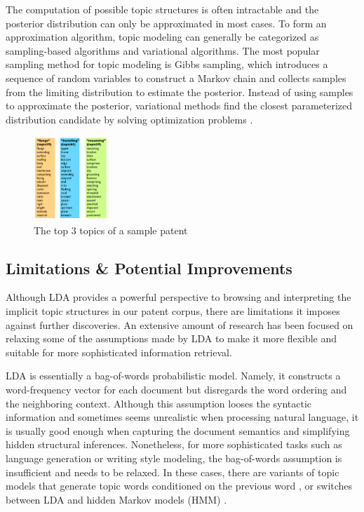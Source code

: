 \documentclass[conference]{IEEEtran}
\begin{document}
The computation of possible topic structures is often intractable and the posterior distribution can only be approximated in most cases. To form an approximation algorithm, topic modeling can generally be categorized as sampling-based algorithms and variational algorithms. The most popular sampling method for topic modeling is Gibbs sampling, which introduces a sequence of random variables to construct a Markov chain and collects samples from the limiting distribution to estimate the posterior. Instead of using samples to approximate the posterior, variational methods find the closest parameterized distribution candidate by solving optimization problems \cite{lda2003} \cite{bach2010}.

\begin{figure}[h]
	\center
	\includegraphics[width=0.25\textwidth]{fig/topics.png}
	\caption{The top 3 topics of a sample patent}
	\label{top3topics}
\end{figure}





\subsection{Limitations \& Potential Improvements}
Although LDA provides a powerful perspective to browsing and interpreting the implicit topic structures in our patent corpus, there are limitations it imposes against further discoveries. An extensive amount of research has been focused on relaxing some of the assumptions made by LDA to make it more flexible and suitable for more sophisticated information retrieval. 

LDA is essentially a bag-of-words probabilistic model. Namely, it constructs a word-frequency vector for each document but disregards the word ordering and the neighboring context. Although this assumption looses the syntactic information and sometimes seems unrealistic when processing natural language, it is usually good enough when capturing the document semantics and simplifying hidden structural inferences. Nonetheless, for more sophisticated tasks such as language generation or writing style modeling, the bag-of-words assumption is insufficient and needs to be relaxed. In these cases, there are variants of topic models that generate topic words conditioned on the previous word \cite{wallach2006}, or switches between LDA and hidden Markov models (HMM) \cite{griffiths2005}.
\end{document}
